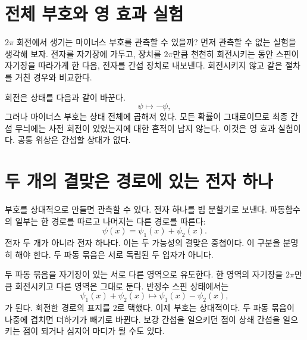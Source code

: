 \section{전체 부호와 영 효과 실험}

\(2\pi\) 회전에서 생기는 마이너스 부호를 관측할 수 있을까? 먼저 관측할 수 없는 실험을 생각해 보자. 전자를 자기장에 가두고, 장치를 \(2\pi\)만큼 천천히 회전시키는 동안 스핀이 자기장을 따라가게 한 다음, 전자를 간섭 장치로 내보낸다. 회전시키지 않고 같은 절차를 거친 경우와 비교한다.

회전은 상태를 다음과 같이 바꾼다.
\begin{equation}
\psi\longmapsto-\psi,
\end{equation}
그러나 마이너스 부호는 상태 전체에 곱해져 있다. 모든 확률이 그대로이므로 최종 간섭 무늬에는 사전 회전이 있었는지에 대한 흔적이 남지 않는다. 이것은 영 효과 실험이다. 공통 위상은 간섭할 상대가 없다.

\begin{classroomqa}
\end{classroomqa}

\section{두 개의 결맞은 경로에 있는 전자 하나}

부호를 상대적으로 만들면 관측할 수 있다. 전자 하나를 빔 분할기로 보낸다. 파동함수의 일부는 한 경로를 따르고 나머지는 다른 경로를 따른다:
\begin{equation}
\psi(x)=\psi_1(x)+\psi_2(x).
\end{equation}
전자 두 개가 아니라 전자 하나다. 이는 두 가능성의 결맞은 중첩이다. 이 구분을 분명히 해야 한다. 두 파동 묶음은 서로 독립된 두 입자가 아니다.

두 파동 묶음을 자기장이 있는 서로 다른 영역으로 유도한다. 한 영역의 자기장을 \(2\pi\)만큼 회전시키고 다른 영역은 그대로 둔다. 반정수 스핀 상태에서는
\begin{equation}
\psi_1(x)+\psi_2(x)
\longmapsto
\psi_1(x)-\psi_2(x),
\end{equation}
가 된다. 회전한 경로의 표지를 \(2\)로 택했다. 이제 부호는 상대적이다. 두 파동 묶음이 나중에 겹치면 더하기가 빼기로 바뀐다. 보강 간섭을 일으키던 점이 상쇄 간섭을 일으키는 점이 되거나 심지어 마디가 될 수도 있다.

